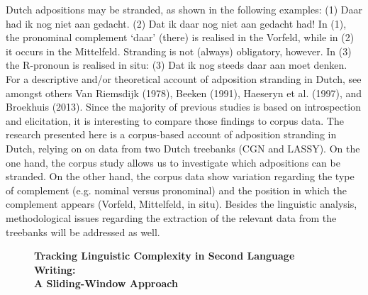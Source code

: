\documentclass[10pt, a4paper, twopage, headinclude, footinclude, BCOR5mm]{scrartcl}
\begin{document}
        \begin{table}[t!]
    \end{table}

\noindent
Dutch adpositions may be stranded, as shown in the following examples:  (1) Daar had ik nog niet aan gedacht. (2) Dat ik daar nog niet aan gedacht had!  In (1), the pronominal complement `daar' (there) is realised in the Vorfeld, while in (2) it occurs in the Mittelfeld. Stranding is not (always) obligatory, however. In (3) the R-pronoun is realised in situ:  (3) Dat ik nog steeds daar aan moet denken.  For a descriptive and/or theoretical account of adposition stranding in Dutch, see amongst others Van Riemsdijk (1978), Beeken (1991), Haeseryn et al. (1997), and Broekhuis (2013). Since the majority of previous studies is based on introspection and elicitation, it is interesting to compare those findings to corpus data. The research presented here is a corpus-based account of adposition stranding in Dutch, relying on on data from two Dutch treebanks (CGN and LASSY).   On the one hand, the corpus study allows us to investigate which adpositions can be stranded. On the other hand, the corpus data show variation regarding the type of complement (e.g. nominal versus pronominal) and the position in which the complement appears (Vorfeld, Mittelfeld, in situ). Besides the linguistic analysis, methodological issues regarding the extraction of the relevant data from the treebanks will be addressed as well.


\newpage

\begin{figure}[t!]
\centering
\large\textbf{Tracking Linguistic Complexity in Second Language Writing: \\ A Sliding-Window Approach}
\vspace*{0.5cm}
\end{figure}
\end{document}

